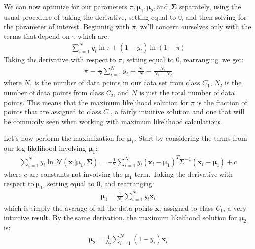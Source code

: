 We can now optimize for our parameters $\pi, \boldsymbol{\mu}_{1}, \boldsymbol{\mu}_{2}, \text{and}, \boldsymbol{\Sigma}$ separately, using the usual procedure of taking the derivative, setting equal to 0, and then solving for the parameter of interest. Beginning with $\pi$, we'll concern ourselves only with the terms that depend on $\pi$ which are:
\begin{align*}
	\sum_{i=1}^{N} y_{i}\ln{\pi} + (1-y_{i})\ln{(1 - \pi)}
\end{align*}
Taking the derivative with respect to $\pi$, setting equal to 0, rearranging, we get:
\begin{align*}
	\pi = \frac{1}{N} \sum_{i=1}^{N} y_{i} = \frac{N_{1}}{N} = \frac{N_{1}}{N_{1} + N_{2}}
\end{align*}
where $N_{1}$ is the number of data points in our data set from class $C_{1}$, $N_{2}$ is the number of data points from class $C_{2}$, and $N$ is just the total number of data points. This means that the maximum likelihood solution for $\pi$ is the fraction of points that are assigned to class $C_{1}$, a fairly intuitive solution and one that will be commonly seen when working with maximum likelihood calculations.

Let's now perform the maximization for $\boldsymbol{\mu}_{1}$. Start by considering the terms from our log likelihood involving $\boldsymbol{\mu}_{1}$:
\begin{align*}
	\sum_{i=1}^{N} y_{i} \ln \mathcal{N}(\textbf{x}_{i} | \boldsymbol{\mu}_{1}, \boldsymbol{\Sigma}) = -\frac{1}{2} \sum_{i=1}^{N} y_{i} (\textbf{x}_{i} - \boldsymbol{\mu}_{1})^{T}\boldsymbol{\Sigma}^{-1}(\textbf{x}_{i} - \boldsymbol{\mu}_{1}) + c
\end{align*}
where $c$ are constants not involving the $\boldsymbol{\mu}_{1}$ term. Taking the derivative with respect to $\boldsymbol{\mu}_{1}$, setting equal to 0, and rearranging:
\begin{align*}
	\boldsymbol{\mu}_{1} = \frac{1}{N_{1}} \sum_{i=1}^{N} y_{i}\textbf{x}_{i}
\end{align*}
which is simply the average of all the data points $\textbf{x}_{i}$ assigned to class $C_{1}$, a very intuitive result. By the same derivation, the maximum likelihood solution for $\boldsymbol{\mu}_{2}$ is:
\begin{align*}
	\boldsymbol{\mu}_{2} = \frac{1}{N_{2}} \sum_{i=1}^{N} (1-y_{i})\textbf{x}_{i}
\end{align*}

